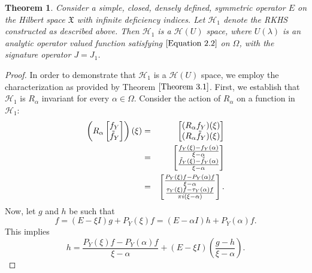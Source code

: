 \documentclass [12pt,reqno]{amsart}
\numberwithin{equation}{subsection}
\newtheorem{thm}{Theorem}[section]
\numberwithin{equation}{section}
\begin{document}
\begin{thm} \label{Theorem 3.3}
Consider a simple, closed, densely defined, symmetric operator $E$ on the Hilbert space $\mathfrak{X}$ with infinite deficiency indices. Let $\mathcal{H}_1$ denote the RKHS constructed as described above. Then $\mathcal{H}_1$ is a $\mathcal{H}(U)$ space, where $U(\lambda)$ is an analytic operator valued function satisfying $\eqref{Equation 2.2}$ on $\Omega$, with the signature operator $J = J_1$.
\end{thm}
\begin{proof}
In order to demonstrate that $\mathcal{H}_1$ is a $\mathcal{H}(U)$ space, we employ the characterization as provided by Theorem $\ref{Theorem 3.1}$. First, we establish that $\mathcal{H}_1$ is $R_\alpha$ invariant for every $\alpha \in \Omega$. Consider the action of $R_\alpha$ on a function in $\mathcal{H}_1$:
\begin{eqnarray}
\left(R_{\alpha} \begin{bmatrix} 
    f_Y  \\
    \tilde{f}_Y \\
    \end{bmatrix}\right) (\xi)\nonumber
&=&  \begin{bmatrix} 
    (R_{\alpha}f_Y)(\xi)  \\
    (R_{\alpha}\tilde{f}_Y)(\xi) \\ 
    \end{bmatrix}\\ \nonumber
\vspace{0.2cm}       
&=&  \begin{bmatrix} 
    \frac{f_Y(\xi)-f_Y(\alpha)}{\xi-\alpha}  \\
    \frac{\tilde{f}_Y(\xi)- \tilde{f}_Y(\alpha)}  {\xi-\alpha}\\
    \end{bmatrix}\\    
\vspace{0.2cm}       
&=&  \begin{bmatrix} \label{Equation 3.20}
    \frac{P_Y(\xi)f-P_Y(\alpha)f}{\xi-\alpha}  \\
    \frac{\tau_Y(\xi)f- \tau_Y(\alpha)f}{\pi      i(\xi-\alpha)}\\
    \end{bmatrix}.
\end{eqnarray}
Now, let $g$ and $h$ be such that 
$$
f
=(E-\xi I)g+P_Y(\xi)f
=(E-\alpha I)h+P_Y(\alpha)f.
$$
This implies $$ h=\frac{P_Y(\xi)f - P_Y(\alpha)f}{\xi-\alpha}+(E-\xi I)\left( \frac{g-h}{\xi-\alpha}\right).$$

\end{proof}
\end{document}
